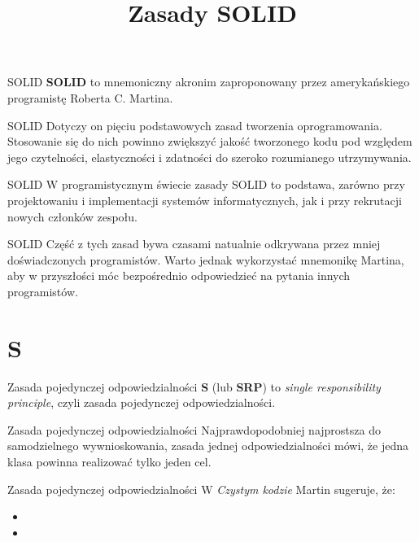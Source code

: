 

\title{Zasady SOLID}



\begin{frame}{SOLID}
	\textbf{SOLID} to mnemoniczny akronim zaproponowany przez amerykańskiego programistę Roberta C. Martina.
\end{frame}

\begin{frame}{SOLID}
	Dotyczy on pięciu podstawowych zasad tworzenia oprogramowania. Stosowanie się do nich powinno zwiększyć jakość tworzonego kodu pod względem jego czytelności, elastyczności i zdatności do szeroko rozumianego utrzymywania.
\end{frame}

\begin{frame}{SOLID}
	W programistycznym świecie zasady SOLID to podstawa, zarówno przy projektowaniu i implementacji systemów informatycznych, jak i przy rekrutacji nowych członków zespołu.
\end{frame}

\begin{frame}{SOLID}
	Część z tych zasad bywa czasami natualnie odkrywana przez mniej doświadczonych programistów. Warto jednak wykorzystać mnemonikę Martina, aby w przyszłości móc bezpośrednio odpowiedzieć na pytania innych programistów.
\end{frame}

\section{S}

\begin{frame}{Zasada pojedynczej odpowiedzialności}
	\textbf{S} (lub \textbf{SRP}) to \emph{single responsibility principle}, czyli zasada pojedynczej odpowiedzialności.
\end{frame}

\begin{frame}{Zasada pojedynczej odpowiedzialności}
	Najprawdopodobniej najprostsza do samodzielnego wywnioskowania, zasada jednej odpowiedzialności mówi, że jedna klasa powinna realizować tylko jeden cel.
\end{frame}

\begin{frame}{Zasada pojedynczej odpowiedzialności}
	W \emph{Czystym kodzie} Martin sugeruje, że:
	\begin{itemize}
		\item
		\item
	\end{itemize}
\end{frame}

